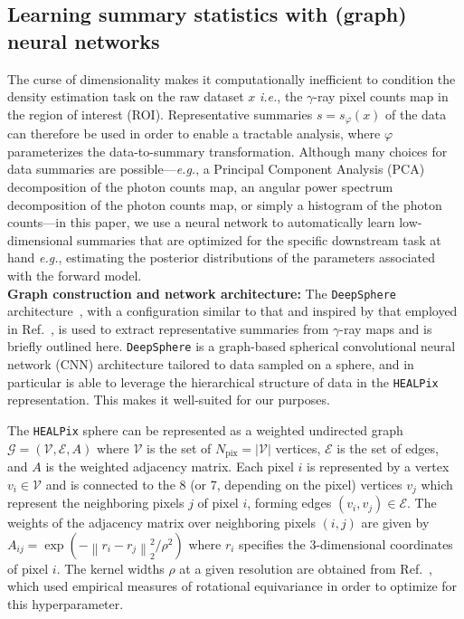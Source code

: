 \documentclass[prd,aps,10pt,nofootinbib,twocolumn,superscriptaddress,preprintnumbers,balancelastpage,longbibliography]{revtex4-1}
\begin{document}
\subsection{Learning summary statistics with (graph) neural networks}

The curse of dimensionality makes it computationally inefficient to condition the density estimation task on the raw dataset $x$ \emph{i.e.}, the $\gamma$-ray pixel counts map in the region of interest (ROI). Representative summaries $s = s_\varphi(x)$ of the data can therefore be used in order to enable a tractable analysis, where $\varphi$ parameterizes the data-to-summary transformation. Although many choices for data summaries are possible---\emph{e.g.}, a Principal Component Analysis (PCA) decomposition of the photon counts map, an angular power spectrum decomposition of the photon counts map, or simply a histogram of the photon counts---in this paper, we use a neural network to automatically learn low-dimensional summaries that are optimized for the specific downstream task at hand \emph{e.g.}, estimating the posterior distributions of the parameters associated with the forward model. \\

\noindent
\textbf{Graph construction and network architecture:}
The \texttt{DeepSphere} architecture~\cite{defferrard2020deepsphere,Perraudin:2018rbt,deepsphere_rlgm}, with a configuration similar to that and inspired by that employed in Ref.~\cite{List:2020mzd}, is used to extract representative summaries from $\gamma$-ray maps and is briefly outlined here. \texttt{DeepSphere} is a graph-based spherical convolutional neural network (CNN) architecture tailored to data sampled on a sphere, and in particular is able to leverage the hierarchical structure of data in the \texttt{HEALPix} representation. This makes it well-suited for our purposes.

The \texttt{HEALPix} sphere can be represented as a weighted undirected graph $\mathcal G = (\mathcal V, \mathcal E, A)$ where $\mathcal V$ is the set of $N_\mathrm{pix} = |\mathcal V|$ vertices, $\mathcal E$ is the set of edges, and $A$ is the weighted adjacency matrix. Each pixel $i$ is represented by a vertex $v_i \in \mathcal V$ and is connected to the 8 (or 7, depending on the pixel)
vertices $v_j$ which represent the neighboring pixels $j$ of pixel $i$, forming edges $(v_i
, v_j) \in \mathcal E$. The weights of the adjacency matrix over neighboring pixels $(i, j)$ are given by $A_{ij} = \exp \left(-{\left\|r_{i}-r_{j}\right\|_{2}^{2}}/{\rho^{2}}\right)$ where $r_i$ specifies the 3-dimensional coordinates of pixel $i$. The kernel widths $\rho$ at a given \HEALPix resolution are obtained from Ref.~\cite{defferrard2020deepsphere}, which used empirical measures of rotational equivariance in order to optimize for this hyperparameter.
\end{document}
